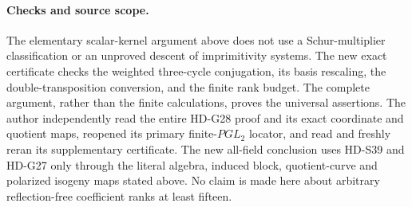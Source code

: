 \paragraph{Checks and source scope.}
The elementary scalar-kernel argument above does not use a
Schur-multiplier classification or an unproved descent of
imprimitivity systems. The new exact certificate checks the
weighted three-cycle conjugation, its basis rescaling, the
double-transposition conversion, and the finite rank budget.
The complete argument, rather than the finite calculations,
proves the universal assertions. The author independently read
the entire HD-G28 proof and its exact coordinate and quotient
maps, reopened its primary finite-\(PGL_2\) locator, and read
and freshly reran its supplementary certificate. The new
all-field conclusion uses HD-S39 and HD-G27 only through the
literal algebra, induced block, quotient-curve and polarized
isogeny maps stated above. No claim is made here about arbitrary
reflection-free coefficient ranks at least fifteen.
